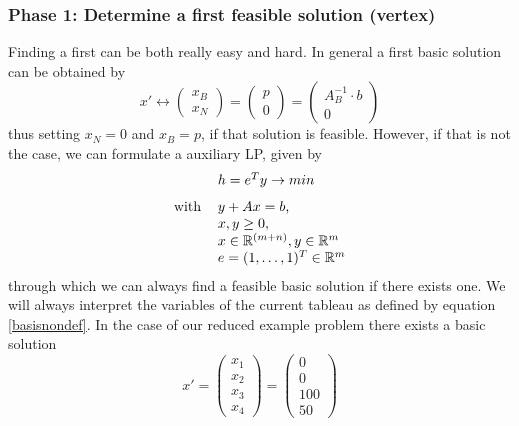 \documentclass[a4paper, 11pt]{article}
\begin{document}
\subsubsection{Phase 1: Determine a first feasible solution (vertex)}
Finding a first can be both really easy and hard. In general a first basic solution can be obtained by 
\begin{equation}
	\label{basisnondef}
	x' \longleftrightarrow 
	\left( \begin{array}{c}
		x_B \\ x_N
	\end{array}\right) = \left(\begin{array}{c}
		p \\ 0
	\end{array}\right) = \left(\begin{array}{c}
		A_B^{-1}\cdot b \\ 0
	\end{array}\right)
\end{equation}
thus setting $x_N=0$ and $x_B=p$, if that solution is feasible. However, if that is not the case, we can formulate a auxiliary LP, given by
\begin{equation}
	\label{hilfsproblem}
	\begin{tabular}{cl}
		&$h = e^T y \rightarrow min$\vspace{0.25cm}\\
		with&$y+Ax = b$,\\
		&$x, y\geq 0,$\\
		&$x\in \mathbb{R}^{(m+n)}, y\in\mathbb{R}^m$\\
		&$e= (1,\dots,1)^T\in\mathbb{R}^m$
	\end{tabular}
\end{equation}
through which we can always find a feasible basic solution if there exists one. We will always interpret the variables of the current tableau as defined by equation \ref{basisnondef}.\medskip
In the case of our reduced example problem there exists a basic solution 
\begin{equation*}
	x' = \left(\begin{array}{c}
		x_1\\x_2\\x_3\\x_4
	\end{array}\right) = \left(\begin{array}{c}
		0\\0\\100\\50
	\end{array}\right)
\end{equation*}
\end{document}
